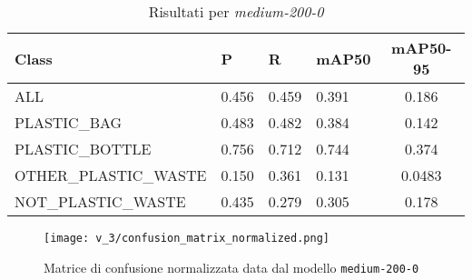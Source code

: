     \begin{table}[!htb]
        \centering
        \begin{tabularx}{\textwidth}{lYYYc}
            \toprule
            Class & P & R & mAP50 & mAP50-95 \\
            \midrule
            ALL & 0.456 & 0.459 & 0.391 & 0.186 \\
            PLASTIC\_BAG & 0.483 & 0.482 & 0.384 & 0.142 \\
            PLASTIC\_BOTTLE & 0.756 & 0.712 & 0.744 & 0.374 \\
            OTHER\_PLASTIC\_WASTE & 0.150 & 0.361 & 0.131 & 0.0483 \\
            NOT\_PLASTIC\_WASTE & 0.435 & 0.279 & 0.305 & 0.178 \\
            \bottomrule
        \end{tabularx}
        \caption{Risultati per \textit{medium-200-0}}
        \label{table:v3-1}
    \end{table}

    \begin{figure}[!htb]
        \centering
        \texttt{[image: v\_3/confusion\_matrix\_normalized.png]}
        \caption{Matrice di confusione normalizzata data dal modello \texttt{medium-200-0}}
        \label{fig:v3-4}
    \end{figure}

